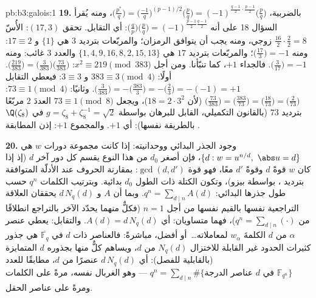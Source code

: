 \begin{solution}{pb:b3:galois:1}
\textbf{19.} بالضربية، $\bigl(\frac{p^*}q\bigr) =
\bigl(\frac{-1}q\bigr)^{(p-1)/2}\bigl(\frac pq\bigr) =
(-1)^{\frac{q-1}2\cdot\frac{p-1}2}\bigl(\frac pq\bigr)$، ومنه يُقرأ السؤال 18 على أنه
$\bigl(\frac qp\bigr)\bigl(\frac
pq\bigr) = (-1)^{\frac{p-1}2\frac{q-1}2}$: أي التقابل. تحقق $(17, 3)$: الأُسّ $\frac{16}2\cdot\frac22 = 8$ زوجي، ومنه
يجب أن يتوافق الرمزان؛ والمربّعات بترديد $3$ هي $\{1\}$ و
$17 \equiv 2$: ومنه $\bigl(\frac{17}3\bigr) = -1$؛ والمربّعات بترديد $17$ هي $\{1, 4,
9, 16, 8, 2, 15, 13\}$
والعدد $3$ غائب: ومنه $\bigl(\frac3{17}\bigr) = -1$. فالجداء $+1$، كما تنبّأنا. ومن
أجل $x^2
\equiv 219 \pmod{383}$: $\bigl(\frac{219}{383}\bigr) =
\bigl(\frac3{383}\bigr)\bigl(\frac{73}{383}\bigr)$. أولًا: $383 \equiv 3 \pmod4$ و $3 \equiv 3$: فيعطي
التقابل $\bigl(\frac3{383}\bigr) = -\bigl(\frac{383}3\bigr) =
-\bigl(\frac23\bigr) = -(-1) = +1$. وثانيًا: $73 \equiv 1
\pmod 4$: $\bigl(\frac{73}{383}\bigr) =
\bigl(\frac{383}{73}\bigr) = \bigl(\frac{18}{73}\bigr) =
\bigl(\frac2{73}\bigr)$ (لأن
$18 = 2\cdot3^2$)، ويجعل $73 \equiv 1
\pmod 8$ العددَ $2$ مربّعًا بترديد $73$
(بالقانون التكميلي، القابل للبرهان بواسطة $g = \zeta_8 + \zeta_8^{-1} = \sqrt2$ في
$\Q(\zeta_8)$ بالطريقة نفسها): أي $+1$. والمجموع $+1$: إذن
المطابقة .

\textbf{20.} وجود الجذر البدائي ووحدانيته: إذا كانت مجموعة دورات
$w$ هي $\{d : w = u^{n/d},\ \abs u = d\}$، فإن أصغر $d_0$ من هذا النوع يقسم كل دور آخر $d$
(إذ إذا كان $w$ قوةً $d$ وقوةً $d'$ معًا، فهو قوة $\gcd(d, d')$:
بمقارنة الحروف عند الأدلّة المتوافقة بترديد ، بواسطة بيزو)، وتكون الكتلة ذات الطول $d_0$ بدائية.
وبترتيب الكلمات $q^n$ حسب طول جذرها البدائي: $q^n = \sum_{d \mid n}A(d)$. وبما أن
$A$ و $d\,N_q(d)$ يحققان العلاقة التراجعية نفسها بالقيم نفسها من
أجل $n = 1$ (فكلٌّ منهما يحدّد الآخر بالتراجع انطلاقًا من
$q^n
= \sum_{d\mid n}(\cdot)$)، فهما متساويان: أي $A(d) =
d\,N_q(d)$. والتقابل: يعطي عنصر
$\alpha$ من  $d$ الكلمةَ $w_\alpha$ لمعاملاته\dots\ أو
أفضل، مباشرةً: فالعناصر ذات  $d$ في $\overline{\mathbb F_q}$ هي جذور
كثيرات الحدود غير القابلة للاختزال $N_q(d)$ من  $d$،
ويساهم كلٌّ منها بجذوره $d$ المتمايزة (بالقابلية للفصل): أي
$d\,N_q(d)$ عنصرًا من  $d$، مطابقًا للعدد $q^n = \sum_{d\mid n}\#\{
\text{عناصر الدرجة } d \text{ في } \mathbb F_{q^n}\}$ ---
وهو الغربال نفسه، مرةً على الكلمات ومرةً على عناصر الحقل.


\end{solution}

